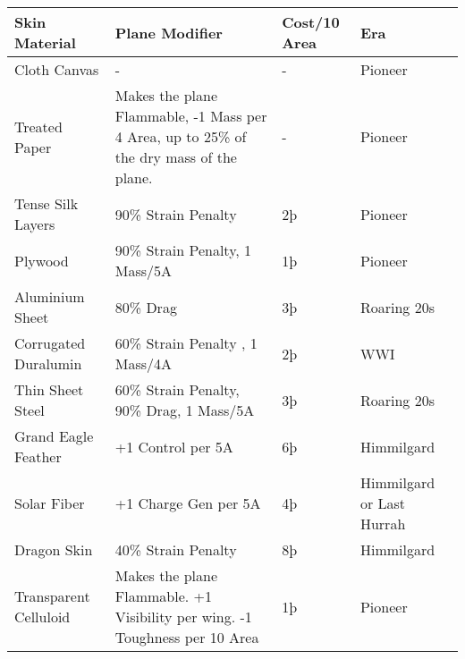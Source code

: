 \documentclass{article}
\begin{document}
\begin{tabular}{|l|l|l|l|}
  \hline
  Skin Material                      & Plane Modifier                                       & Cost/10 Area & Era                       \\\hline
  Cloth Canvas                       & -                                                    & -            & Pioneer                   \\\hline
  Treated Paper                      & Makes the plane Flammable, -1 Mass per 4 Area, up to
  25\% of the dry mass of the plane. & -                                                    & Pioneer                                  \\\hline
  Tense Silk Layers                  & 90\% Strain Penalty                                  & 2þ           & Pioneer                   \\\hline
  Plywood                            & 90\% Strain Penalty, 1 Mass/5A                       & 1þ           & Pioneer                   \\\hline
  Aluminium Sheet                    & 80\% Drag                                            & 3þ           & Roaring 20s               \\\hline
  Corrugated Duralumin               & 60\% Strain Penalty , 1 Mass/4A                      & 2þ           & WWI                       \\\hline
  Thin Sheet Steel                   & 60\% Strain Penalty, 90\% Drag, 1 Mass/5A            & 3þ           &
  Roaring 20s                                                                                                                          \\\hline
  Grand Eagle Feather                & +1 Control per 5A                                    & 6þ           & Himmilgard                \\\hline
  Solar Fiber                        & +1 Charge Gen per 5A                                 & 4þ           & Himmilgard or Last Hurrah \\\hline
  Dragon Skin                        & 40\% Strain Penalty                                  & 8þ           & Himmilgard                \\\hline
  Transparent Celluloid              & Makes the plane Flammable. +1 Visibility per
  wing. -1 Toughness per 10 Area     & 1þ                                                   & Pioneer                                  \\\hline
\end{tabular}
\end{document}
